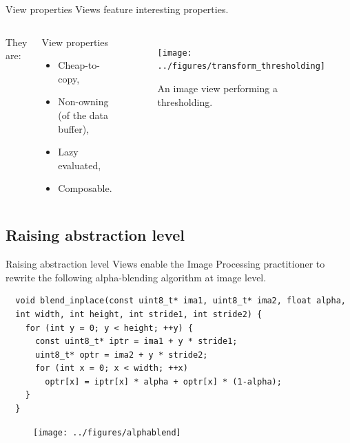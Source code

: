 \documentclass[12pt,aspectratio=169]{beamer}
\begin{document}
\begin{frame}[fragile]{View properties}
  Views feature interesting properties.
  \begin{columns}[T,onlytextwidth]
    They are:
    \begin{alertblock}{View properties}
      \begin{itemize}
        \item Cheap-to-copy,
        \item Non-owning (of the data buffer),
        \item Lazy evaluated,
        \item Composable.
      \end{itemize}
    \end{alertblock}

    \begin{figure}
      \begin{minipage}{\linewidth}
        \texttt{[image: ../figures/transform\_thresholding]}
      \end{minipage}
      \caption{An image view performing a thresholding.}
      \label{fig.view.threshold}
    \end{figure}
  \end{columns}
\end{frame}

\subsection{Raising abstraction level}

\begin{frame}[fragile]{Raising abstraction level}
  Views enable the Image Processing practitioner to rewrite the following alpha-blending algorithm at image level.
  \begin{verbatim}
  void blend_inplace(const uint8_t* ima1, uint8_t* ima2, float alpha,
  int width, int height, int stride1, int stride2) {
    for (int y = 0; y < height; ++y) {
      const uint8_t* iptr = ima1 + y * stride1;
      uint8_t* optr = ima2 + y * stride2;
      for (int x = 0; x < width; ++x)
        optr[x] = iptr[x] * alpha + optr[x] * (1-alpha);
    }
  }
  \end{verbatim}
  \centering
  \begin{figure}
    \texttt{[image: ../figures/alphablend]}
  \end{figure}
\end{frame}
\end{document}
